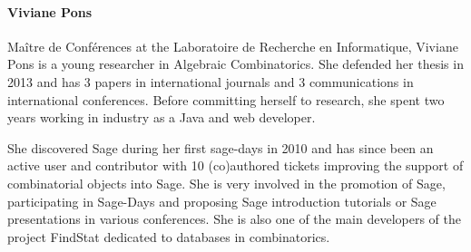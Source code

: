 \paragraph{Viviane Pons}

%

%

Maître de Conférences at the Laboratoire de Recherche en Informatique, 
Viviane Pons is a young researcher in Algebraic Combinatorics. She defended
her thesis in 2013 and has 3 papers in international journals and 3 
communications in international conferences. Before committing herself
to research, she spent two years working in industry as a Java and web
developer.

She discovered Sage during her first sage-days in 2010 and has since 
been an active user and contributor with 10 (co)authored tickets improving
the support of combinatorial objects into Sage. She is very involved in 
the promotion of Sage, participating in Sage-Days and proposing Sage
introduction tutorials or Sage presentations in various conferences. 
She is also one of the main developers of the project FindStat dedicated 
to databases in combinatorics.
